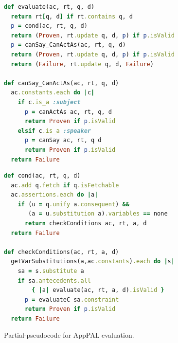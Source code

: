 \documentclass[]{llncs}
\begin{document}
\begin{figure}
\begin{minipage}[b]{0.5\linewidth}
\begin{lstlisting}[language=Ruby, basicstyle=\ttfamily, keywordstyle=\scriptsize\slshape, columns=flexible]
def evaluate(ac, rt, q, d)
  return rt[q, d] if rt.contains q, d
  p = cond(ac, rt, q, d)
  return (Proven, rt.update q, d, p) if p.isValid
  p = canSay_CanActAs(ac, rt, q, d)
  return (Proven, rt.update q, d, p) if p.isValid
  return (Failure, rt.update q, d, Failure)

def canSay_CanActAs(ac, rt, q, d)
  ac.constants.each do |c|
    if c.is_a :subject
      p = canActAs ac, rt, q, d
      return Proven if p.isValid
    elsif c.is_a :speaker
      p = canSay ac, rt, q d
      return Proven if p.isValid
  return Failure
\end{lstlisting}
\end{minipage}
\begin{minipage}[b]{0.5\linewidth}
\begin{lstlisting}[language=Ruby, basicstyle=\ttfamily, keywordstyle=\scriptsize\slshape, columns=flexible]
def cond(ac, rt, q, d)
  ac.add q.fetch if q.isFetchable
  ac.assertions.each do |a|
    if (u = q.unify a.consequent) &&
       (a = u.substitution a).variables == none
      return checkConditions ac, rt, a, d
  return Failure

def checkConditions(ac, rt, a, d)
  getVarSubstitutions(a,ac.constants).each do |s|
    sa = s.substitute a
    if sa.antecedents.all
        { |a| evaluate(ac, rt, a, d).isValid }
      p = evaluateC sa.constraint
      return Proven if p.isValid
  return Failure
\end{lstlisting}
\end{minipage}
\caption{Partial-pseudocode for AppPAL evaluation.}
\label{fig:pseudocode}
\end{figure}
\end{document}
